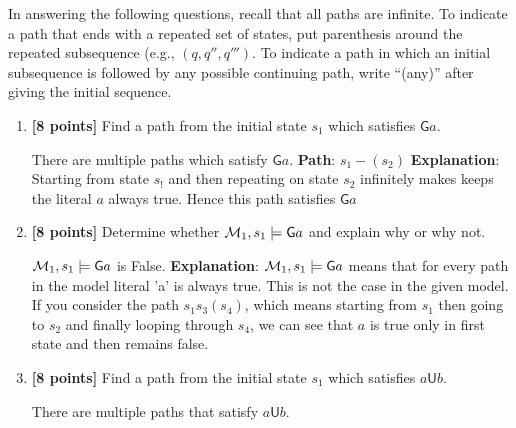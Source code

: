 \documentclass{article}
\def\Forever{\mathord{\mathsf{G}}}
\def\Until{\mathrel{\mathsf{U}}}
\begin{document}
\begin{itemize}
\begin{figure}[h]
\begin{center}
\end{center}
\label{f1}
\end{figure}
  \par
  In answering the following questions, recall that all paths are
  infinite.  To indicate a path that ends with a repeated set of
  states, put parenthesis around the repeated subsequence (e.g., $(q,
  q'', q''')$.  To indicate a path in which an initial subsequence is
  followed by any possible continuing path, write ``(any)'' after
  giving the initial sequence.
  \begin{enumerate}
  \item \textbf{[8 points]} Find a path from the initial state $s_1$
    which satisfies $\Forever a$.
    \begin{answer}
    	There are multiple paths which satisfy $\Forever a$. \newline 
    	\textbf{Path}: $s_1-(s_2)$ \newline
    	\textbf{Explanation}: Starting from state $s_!$ and then repeating on state $s_2$
    	infinitely makes keeps the literal $a$ always true. Hence this path
    	satisfies $\Forever a$
    \end{answer}
    \bigskip
  \item \textbf{[8 points]} Determine whether ${\cal M}_1, s_1 \models
    \Forever a$ and explain why or why not.
    \begin{answer}
    	${\cal M}_1, s_1 \models \Forever a$ is False. \newline
    	\textbf{Explanation}: ${\cal M}_1, s_1 \models \Forever a$ means that for
    	every path in the model literal 'a' is always true. This is not the case in
    	the given model. If you consider the path $s_1s_3(s_4)$, which means
    	starting from $s_1$ then going to $s_2$ and finally looping through $s_4$,
    	we can see that $a$ is true only in first state and then remains false. 
    \end{answer}
    \bigskip
  \item \textbf{[8 points]} Find a path from the initial state $s_1$
    which satisfies $a \Until b$.
    \begin{answer}
    	There are multiple paths that satisfy $a \Until b$. \newline

\end{answer}
\end{enumerate}
\end{itemize}
\end{document}

